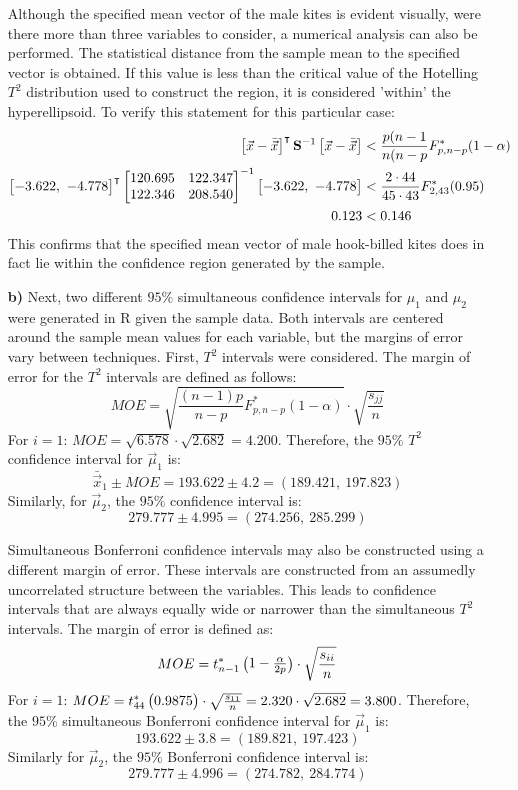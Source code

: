 \begin{enumerate}
Although the specified mean vector of the male kites is evident visually, were there more than three variables to consider, a numerical analysis can also be performed. The statistical distance from the sample mean to the specified vector is obtained. If this value is less than the critical value of the Hotelling $T^2$ distribution used to construct the region, it is considered 'within' the hyperellipsoid. To verify this statement for this particular case: 
\begin{align*}
	\m{\vec{x} - \bar{\vec{x}}}^{\intercal} \mf{S}^{-1} \m{\vec{x} - \bar{\vec{x}}} &<  \frac{p(n-1}{n(n-p} F_{p, n-p}^*(1-\alpha) \\
	\m{-3.622,\ -4.778}^{\intercal} \m{120.695 & 122.347 \\ 122.346 & 208.540}^{-1} \m{-3.622,\ -4.778} &< \frac{2 \cdot 44}{45 \cdot 43}F_{2, 43}^*(0.95) \\
	0.123 &< 0.146
\end{align*}
This confirms that the specified mean vector of male hook-billed kites does in fact lie within the confidence region generated by the sample.
	
\item[\bf{b)}] Next, two different $95\%$ simultaneous confidence intervals for $\mu_1$ and $\mu_2$ were generated in R given the sample data. Both intervals are centered around the sample mean values for each variable, but the margins of error vary between techniques. First, $T^2$ intervals were considered. The margin of error for the $T^2$ intervals are defined as follows: $$MOE = \sqrt{\frac{(n-1)p}{n-p}F_{p, n-p}^*(1-\alpha)} \cdot \sqrt{\frac{s_{jj}}{n}}$$ For $i = 1$: $MOE = \sqrt{6.578} \cdot \sqrt{2.682} = 4.200$. Therefore, the $95\%$ $T^2$ confidence interval for $\vec{\mu}_1$ is: $$\bar{\vec{x}}_1 \pm MOE = 193.622 \pm 4.2 = (189.421,\ 197.823)$$ Similarly, for $\vec{\mu}_2$, the $95\%$ confidence interval is: $$279.777 \pm 4.995 = (274.256,\ 285.299)$$

	Simultaneous Bonferroni confidence intervals may also be constructed using a different margin of error. These intervals are constructed from an assumedly uncorrelated structure between the variables. This leads to confidence intervals that are always equally wide or narrower than the simultaneous $T^2$ intervals. The margin of error is defined as: $$MOE = t_{n-1}^*\begin{pmatrix}1-\frac{\alpha}{2p}\end{pmatrix} \cdot \sqrt{\frac{s_{ii}}{n}}$$ For $i = 1$: $MOE = t_{44}^*\begin{pmatrix}0.9875\end{pmatrix} \cdot \sqrt{\frac{s_{11}}{n}} = 2.320 \cdot \sqrt{2.682} = 3.800$. Therefore, the $95\%$ simultaneous Bonferroni confidence interval for $\vec{\mu}_1$ is: $$193.622 \pm 3.8 = (189.821,\ 197.423)$$ Similarly for $\vec{\mu}_2$, the $95\%$ Bonferroni confidence interval is: $$279.777 \pm 4.996 = (274.782,\ 284.774)$$
	

\end{enumerate}

